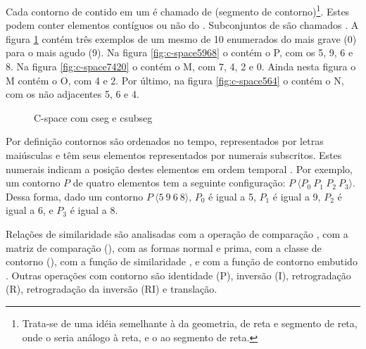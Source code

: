 Cada contorno de  contido em um  é
chamado de  (segmento de contorno)\footnote{Trata-se de
  uma idéia semelhante à da geometria, de reta e segmento de reta,
  onde o  seria análogo à reta, e o  ao
  segmento de reta.}. Estes  podem conter elementos
contíguos ou não do . Subconjuntos de  são
chamados . A figura \ref{fig:c-space} contém três
exemplos de um mesmo  de 10  enumerados
do mais grave (0) para o mais agudo (9). Na figura
\ref{fig:c-space5968} o  contém o  P, com
os  5, 9, 6 e 8. Na figura \ref{fig:c-space7420} o
 contém o  M, com  7, 4, 2 e
0. Ainda nesta figura o  M contém o  O, com
 4 e 2. Por último, na figura \ref{fig:c-space564} o
 contém o  N, com os  não
adjacentes 5, 6 e 4.

\begin{figure}
  \centering
  \caption{C-space com cseg e csubseg}
  \label{fig:c-space}
\end{figure}

Por definição contornos são ordenados no tempo, representados por
letras maiúsculas e têm seus elementos representados por numerais
subscritos. Estes numerais indicam a posição destes elementos em ordem
temporal \cite{marvin.ea87:relating}. Por exemplo, um contorno $P$ de
quatro elementos tem a seguinte configuração: $P\:\langle
P_0\:P_1\:P_2\:P_3\rangle$. Dessa forma, dado um contorno
$P\:\langle5\:9\:6\:8\rangle$, $P_0$ é igual a 5, $P_1$ é igual a 9,
$P_2$ é igual a 6, e $P_3$ é igual a 8.

Relações de similaridade \cite{marvin.ea87:relating} são analisadas
com a operação de comparação , com a matriz de comparação
(), com as formas normal e prima, com a classe de
contorno (), com a função de similaridade , e
com a função de contorno embutido . Outras operações com
contorno são identidade (P), inversão (I), retrogradação (R),
retrogradação da inversão (RI) e translação.

